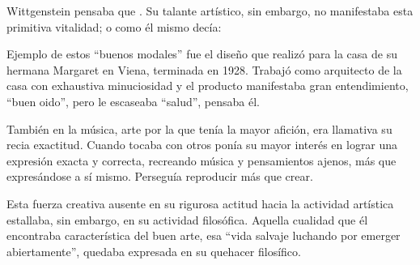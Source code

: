 Wittgenstein pensaba que
\autocite[p.~43e]{wittgenstein1998cnv}. Su talante artístico, sin
embargo, no manifestaba esta primitiva vitalidad; o como él mismo decía:
\autocite[p.~29e]{wittgenstein1998cnv}

Ejemplo de estos ``buenos modales'' fue el diseño que realizó para la casa de su
hermana Margaret en Viena, terminada en 1928.
Trabajó como arquitecto de la casa con exhaustiva minuciosidad y el producto
manifestaba gran entendimiento, ``buen oido'', pero le escaseaba ``salud'',
pensaba él.\autocite[p.~43e]{wittgenstein1998cnv}


También en la música, arte por la que tenía la mayor afición, era llamativa su
recia exactitud. Cuando tocaba con otros ponía su mayor interés en lograr una
expresión exacta y correcta, recreando música y pensamientos ajenos, más que
expresándose a sí mismo. Perseguía reproducir más que
crear.\autocite[loc.˜]{monk1991duty}

Esta fuerza creativa ausente en su rigurosa actitud hacia la actividad artística
estallaba, sin embargo, en su actividad filosófica. Aquella cualidad que él
encontraba característica del buen arte, esa ``vida salvaje luchando por emerger
abiertamente'',\autocite[cf.˜][loc.˜]{monk1991duty} quedaba expresada en su
quehacer filosífico.

